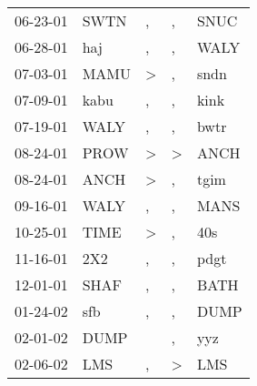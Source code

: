 \begin{supertabular}{p{0.07\textwidth}p{0.06\textwidth}p{0.02\textwidth}p{0.02\textwidth}p{0.06\textwidth}}
          06-23-01\textsuperscript{} &           SWTN\textsuperscript{} &                , &                , &           SNUC\textsuperscript{} \\
          06-28-01\textsuperscript{} &            haj\textsuperscript{} &                , &                , &           WALY\textsuperscript{} \\
          07-03-01\textsuperscript{} &           MAMU\textsuperscript{} &     \textgreater &                , &           sndn\textsuperscript{} \\
          07-09-01\textsuperscript{} &           kabu\textsuperscript{} &                , &                , &           kink\textsuperscript{} \\
          07-19-01\textsuperscript{} &           WALY\textsuperscript{} &                , &                , &           bwtr\textsuperscript{} \\
          08-24-01\textsuperscript{} &           PROW\textsuperscript{} &     \textgreater &     \textgreater &           ANCH\textsuperscript{} \\
          08-24-01\textsuperscript{} &           ANCH\textsuperscript{} &     \textgreater &                , &           tgim\textsuperscript{} \\
          09-16-01\textsuperscript{} &           WALY\textsuperscript{} &                , &                , &           MANS\textsuperscript{} \\
          10-25-01\textsuperscript{} &           TIME\textsuperscript{} &     \textgreater &                , &            40s\textsuperscript{} \\
          11-16-01\textsuperscript{} &            2X2\textsuperscript{} &                , &                , &           pdgt\textsuperscript{} \\
          12-01-01\textsuperscript{} &           SHAF\textsuperscript{} &                , &                , &           BATH\textsuperscript{} \\
          01-24-02\textsuperscript{} &            sfb\textsuperscript{} &                , &                , &           DUMP\textsuperscript{} \\
          02-01-02\textsuperscript{} &           DUMP\textsuperscript{} &                  &                , &            yyz\textsuperscript{} \\
          02-06-02\textsuperscript{} &            LMS\textsuperscript{} &                , &     \textgreater &            LMS\textsuperscript{} \\

\end{supertabular}
